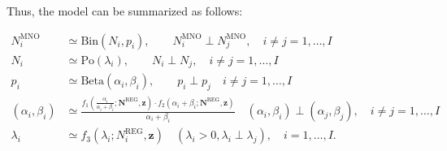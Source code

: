 \documentclass[12pt, a4paper]{article}
\begin{document}
Thus, the model can be summarized as follows:

\begin{align}
N_{i}^{\textrm{MNO}}&\simeq\textrm{Bin}\left(N_{i}, p_{i}\right),\qquad N_{i}^{\textrm{MNO}}\perp N_{j}^{\textrm{MNO}},\quad i\neq j=1,\dots,I\\
N_{i}&\simeq\textrm{Po}\left(\lambda_{i}\right),\qquad N_{i}\perp N_{j},\quad i\neq j=1,\dots,I\nonumber\\
p_{i}&\simeq\textrm{Beta}\left(\alpha_{i},\beta_{i}\right),\qquad p_{i}\perp p_{j}\quad i\neq j=1,\dots,I\nonumber\\
\left(\alpha_{i}, \beta_{i}\right)&\simeq \frac{f_{1}(\frac{\alpha_{i}}{\alpha_{i}+\beta_{i}}; \mathbf{N}^{\textrm{REG}}, \mathbf{z})\cdot f_{2}(\alpha_{i}+\beta_{i}; \mathbf{N}^{\textrm{REG}}, \mathbf{z})}{\alpha_{i}+\beta_{i}}\quad
(\alpha_{i},\beta_{i})\perp(\alpha_{j},\beta_{j}),\quad i\neq j=1,\dots,I\nonumber\\
\lambda_{i}&\simeq f_{3}(\lambda_{i}; N_{i}^{\textrm{REG}}, \mathbf{z})\quad (\lambda_{i} > 0, \lambda_{i}\perp\lambda_{j}), \quad i=1,\dots,I.\nonumber
\end{align}
\end{document}

